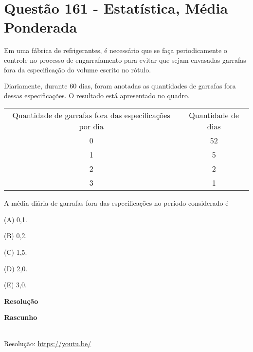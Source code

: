 \section{Questão 161 - Estatística, Média Ponderada}

Em uma fábrica de refrigerantes, é necessário que se faça periodicamente o controle no processo de engarrafamento para evitar que sejam envasadas garrafas fora da  especificação do volume escrito no rótulo.

Diariamente, durante 60 dias, foram anotadas as quantidades de garrafas fora dessas especificações. O resultado está apresentado no quadro.


\begin{table}[]
    \begin{tabular}{cc}
        \rowcolor[HTML]{BFBFBF} 
        {\color[HTML]{000000} Quantidade de garrafas fora das especificações por dia} & {\color[HTML]{000000} Quantidade de dias} \\
        {\color[HTML]{000000} 0}                                                      & {\color[HTML]{000000} 52}                 \\
        {\color[HTML]{000000} 1}                                                      & {\color[HTML]{000000} 5}                  \\
        {\color[HTML]{000000} 2}                                                      & {\color[HTML]{000000} 2}                  \\
        {\color[HTML]{000000} 3}                                                      & {\color[HTML]{000000} 1}                 
    \end{tabular}
\end{table}


A média diária de garrafas fora das especificações no período considerado é

(A)  0,1.

(B)  0,2.

(C)  1,5.

(D)  2,0.

(E)  3,0.

\textbf{Resolução}

\textbf{Rascunho}

\quad


\begin{center}
    \href{https://youtu.be/}{
    }\\
    Resolução: \url{https://youtu.be/}
\end{center}
